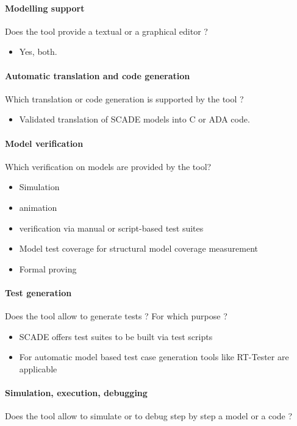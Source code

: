 \paragraph{Modelling support}
Does the tool provide a  textual or a graphical editor ? 

\begin{itemize}
	\item Yes, both.
\end{itemize}


\paragraph{Automatic translation and code generation}
Which translation or code generation is supported by the tool ?

\begin{itemize}
	\item Validated translation of SCADE models into C or ADA code.
\end{itemize}

\paragraph{Model verification}
Which verification on models are provided by the tool?

\begin{itemize}
	\item Simulation
	\item animation
	\item verification via manual or script-based test suites
	\item Model test coverage for structural model coverage measurement
	\item Formal proving
\end{itemize}

\paragraph{Test generation}
Does the tool allow to generate tests ? For  which purpose ?

\begin{itemize}
	\item SCADE offers test suites to be built via test scripts
	\item For automatic model based test case generation tools like RT-Tester are applicable
\end{itemize}

\paragraph{Simulation, execution, debugging}
Does the tool allow to simulate or to debug step by step a model or a code ?

